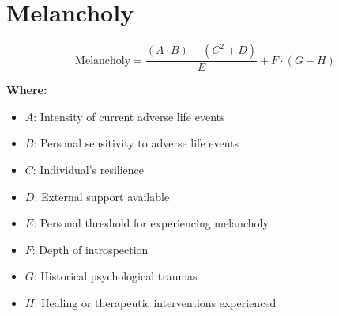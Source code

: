 \chapter{Melancholy}

\begin{equation}
\text{Melancholy} = \frac{(A \cdot B) - (C^2 + D)}{E} + F \cdot (G - H)
\end{equation}

\textbf{Where:}

\begin{itemize}
    \item $A$: Intensity of current adverse life events
    \item $B$: Personal sensitivity to adverse life events
    \item $C$: Individual's resilience
    \item $D$: External support available
    \item $E$: Personal threshold for experiencing melancholy
    \item $F$: Depth of introspection
    \item $G$: Historical psychological traumas
    \item $H$: Healing or therapeutic interventions experienced
\end{itemize}
